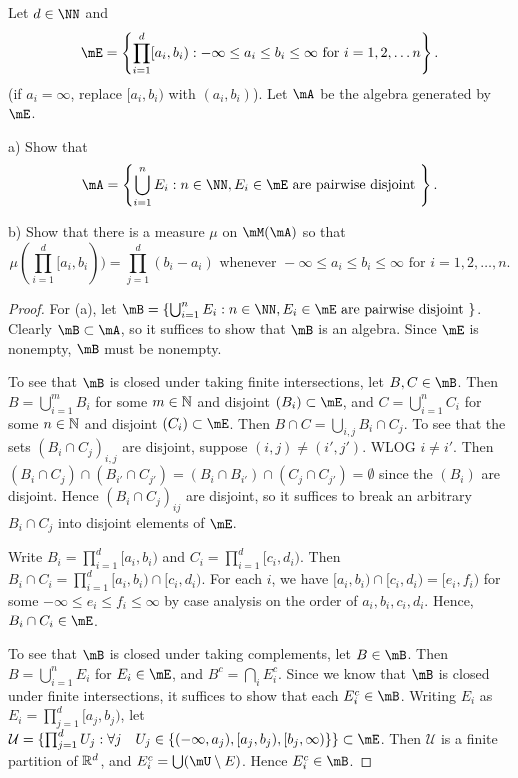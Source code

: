\documentclass{article}
\begin{document}
 Let $d \in \NN$ and 
$$\mE = \left\{ \prod_{i=1}^d [a_i, b_i) : -\infty \le a_i \le b_i \le \infty \text{ for } i = 1,2, \ldots n \right\}.$$
(if $a_i = \infty$, replace $[a_i, b_i)$ with $(a_i, b_i)$). Let $\mA$ be the algebra generated by $\mE$.

a) Show that 
$$\mA = \left\{ \bigcup_{i=1}^n E_i : n\in \NN, E_i \in \mE \text{ are pairwise disjoint } \right\}.$$

b) Show that there is a measure $\mu$ on $\mM(\mA)$ so that 
$$\mu(\prod_{i=1}^d [a_i, b_i)) = \prod_{j=1}^d (b_i - a_i) \text{ whenever } -\infty \le a_i \le b_i \le \infty \text{ for } i = 1,2, \ldots, n.$$

\begin{proof}
For (a), let $\mB = \left\{ \bigcup_{i=1}^n E_i : n\in \NN, E_i \in \mE \text{ are pairwise disjoint } \right\}$.  Clearly $\mB \subset \mA$, so it suffices to show that $\mB$ is an algebra. Since $\mE$ is nonempty, $\mB$ must be nonempty.  

To see that $\mB$ is closed under taking finite intersections,  let $B,C \in \mB$. Then $B = \bigcup_{i=1}^m B_i$ for some $m \in \mathbb{N}$ and disjoint $(B_i) \subset \mE$, and $C = \bigcup_{i=1}^n C_i$ for some $n \in \mathbb{N}$ and disjoint $(C_i) \subset \mE$. Then $B \cap C = \bigcup_{i,j} B_i \cap C_j$. To see that the sets $(B_i \cap C_j)_{i,j}$ are disjoint, suppose $(i,j) \neq (i',j')$.  WLOG $i \neq i'$. Then $(B_i \cap C_j) \cap (B_{i'} \cap C_{j'}) = (B_i \cap B_{i'}) \cap (C_j \cap C_{j'}) = \emptyset$ since the $(B_i)$ are disjoint.  Hence $(B_i \cap C_j)_{ij}$ are disjoint, so it suffices to break an arbitrary $B_i \cap C_j$ into disjoint elements of $\mE$. 

Write $B_i = \prod_{i=1}^d [a_i, b_i)$ and $C_i = \prod_{i=1}^d [c_i, d_i)$.  Then $B_i \cap C_i = \prod_{i=1}^d [a_i, b_i) \cap [c_i, d_i)$.  For each $i$, we have $[a_i, b_i) \cap [c_i, d_i) = [e_i, f_i)$ for some $-\infty \le e_i \le f_i \le \infty$ by case analysis on the order of $a_i, b_i, c_i, d_i$.  Hence, $B_i \cap C_i \in \mE$.

To see that $\mB$ is closed under taking complements, let $B \in \mB$. Then $B = \bigcup_{i=1}^n E_i$ for $E_i \in \mE$, and $B^c = \bigcap_i E_i^c$.  Since we know that $\mB$ is closed under finite intersections, it suffices to show that each $E_i^c \in \mB$.  Writing $E_i$ as $E_i = \prod_{j=1}^d [a_j, b_j)$, let $\mathcal U = \{\prod_{j=1}^d U_j : \forall j \quad U_j \in \{ (-\infty, a_j), [a_j, b_j), [b_j,\infty) \} \} \subset \mE$.  Then $\mathcal U$ is a finite partition of $\mathbb{R}^d$, and $E_i^c = \bigcup (\mU \setminus E)$.  Hence $E_i^c \in \mB$.


\end{proof}
\end{document}
